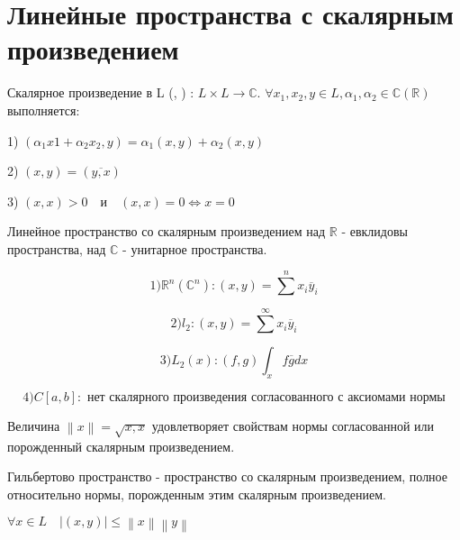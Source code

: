 \documentclass[12pt, a4paper]{report}
\begin{document}
\section{Линейные пространства с скалярным произведением}

\begin{definition}
    Скалярное произведение в L (, ) : \( L \times L \to  \mathbb{C} \). \( \forall x_1,x_2, y \in  L, \alpha_1,\alpha_2 \in \mathbb{C}(\mathbb{R}) \) выполняется: 

    1) \( (\alpha_1x1 + \alpha_2 x_2, y ) = \alpha_1(x,y )+ \alpha_2 (x,y) \) 

    2) \( (x,y ) = (\overline{y,x} )\)  

    3) \( (x,x ) > 0 \quad \text{и}  \quad  (x,x ) = 0 \Leftrightarrow x =0\) 
\end{definition}

Линейное пространство со скалярным произведением над \( \mathbb{R}   \) - евклидовы пространства, над \( \mathbb{C}    \) - унитарное пространства. 

\[ 1) \mathbb{R} ^ n ( \mathbb{C}^ n ): (x, y ) = \sum  ^{n }  x_i \overline{y } _i   \] 

\[ 2) l_2 : (x,y ) = \sum ^{\infty  } x_i \overline{y } _i   \] 

\[ 3) L_2(x ) : (f,g ) \int  _{x } f \overline{g } dx   \] 

\[ 4) C[a,b ] : \text{ нет скалярного произведения согласованного  с аксиомами нормы} \] 

\begin{lemma}
    Величина \( \left\lVert x  \right\rVert = \sqrt{x,x} \) удовлетворяет свойствам нормы согласованной или порожденный скалярным произведением.
\end{lemma}


\begin{definition}
    Гильбертово пространство - пространство со скалярным произведением, полное относительно нормы, порожденным этим скалярным произведением.
\end{definition}

\begin{lemma}
    \( \forall x \in  L \quad  |(x, y )| \le  \left\lVert x  \right\rVert \left\lVert y \right\rVert \) 
\end{lemma}
\end{document}
